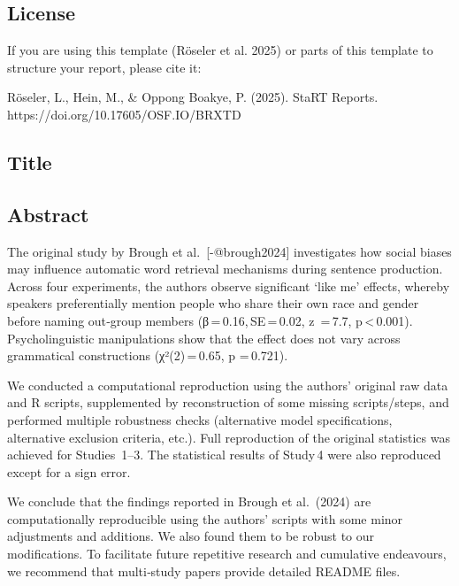 \documentclass[
  letterpaper,
  DIV=11,
  numbers=noendperiod]{scrartcl}
\begin{document}
\subsection*{License}\label{license}

If you are using this template (Röseler et al. 2025) or parts of this
template to structure your report, please cite it:

Röseler, L., Hein, M., \& Oppong Boakye, P. (2025). StaRT Reports.\\
https://doi.org/10.17605/OSF.IO/BRXTD

\newpage{}

\subsection*{Title}\label{title}

\subsection*{Abstract}\label{abstract}

The original study by Brough et al.~{[}-@brough2024{]} investigates how
social biases may influence automatic word retrieval mechanisms during
sentence production. Across four experiments, the authors observe
significant `like me' effects, whereby speakers preferentially mention
people who share their own race and gender before naming out‑group
members (β\,=\,0.16,\,SE\,=\,0.02, z~=\,7.7, p\,\textless\,0.001).
Psycholinguistic manipulations show that the effect does not vary across
grammatical constructions (χ²(2)\,=\,0.65, p =\,0.721).

We conducted a computational reproduction using the authors' original
raw data and R scripts, supplemented by reconstruction of some missing
scripts/steps, and performed multiple robustness checks (alternative
model specifications, alternative exclusion criteria, etc.). Full
reproduction of the original statistics was achieved for Studies\, 1--3.
The statistical results of Study\,4 were also reproduced except for a
sign error.

We conclude that the findings reported in Brough et al.~(2024) are
computationally reproducible using the authors' scripts with some minor
adjustments and additions. We also found them to be robust to our
modifications. To facilitate future repetitive research and cumulative
endeavours, we recommend that multi‑study papers provide detailed README
files.
\end{document}
